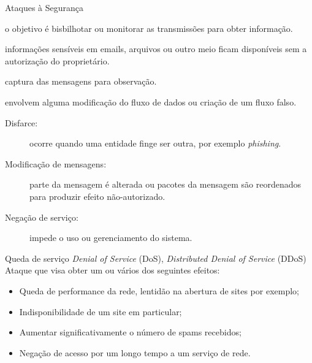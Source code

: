 
\begin{frame}{Ataques à Segurança}\small
  \begin{description}[<+->]
  \item[Ataques passivos:] o objetivo é bisbilhotar ou monitorar as transmissões 
    para obter informação.
    \begin{description}[<+->]
    \item[Vazamento de conteúdo:] informações sensíveis em emails, arquivos 
      ou outro meio ficam disponíveis sem a autorização do proprietário.
    \item[Análise de tráfego:] captura das mensagens para observação.
    \end{description}
  \item[Ataques ativos:] envolvem alguma modificação do fluxo de dados 
    ou criação de um fluxo falso.
    \begin{description}
    \item[Disfarce:] ocorre quando uma entidade finge ser outra, por exemplo {\it phishing}.
    \item[Modificação de mensagens:] parte da mensagem é alterada ou pacotes 
      da mensagem são reordenados para produzir efeito não-autorizado.
    \item[Negação de serviço:] impede o uso ou gerenciamento do sistema.
    \end{description}
  \end{description}
\end{frame}

  \begin{frame}{Queda de serviço}
    {\em  Denial of Service} (DoS), {\em Distributed Denial of Service} (DDoS)\\
    Ataque que visa obter um ou vários dos seguintes efeitos:
    \begin{itemize}[<+->]
    \item Queda de performance da rede, lentidão na abertura de sites por exemplo;
    \item Indisponibilidade de um site em particular;
    \item Aumentar significativamente o número de spams recebidos;
    \item Negação de acesso por um longo tempo a um serviço de rede.
    \end{itemize}
  \end{frame}

